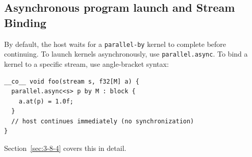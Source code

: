 \subsection*{Asynchronous program launch and Stream Binding}

By default, the host waits for a \texttt{parallel-by} kernel to complete before continuing. To launch kernels asynchronously, use \texttt{parallel.async}. To bind a kernel to a specific stream, use angle-bracket syntax:

\begin{lstlisting}[language=croqtile,caption={Asynchronous program launch and Stream Binding}]
__co__ void foo(stream s, f32[M] a) {
  parallel.async<s> p by M : block {
    a.at(p) = 1.0f;
  }
  // host continues immediately (no synchronization)
}
\end{lstlisting}

Section~\ref{sec:3-8-4} covers this in detail.
